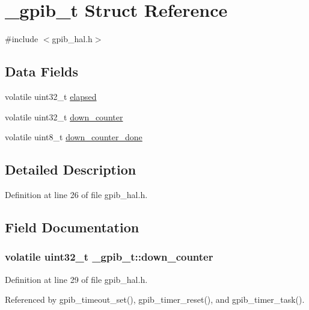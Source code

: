 \hypertarget{struct__gpib__t}{\section{\-\_\-gpib\-\_\-t Struct Reference}
\label{struct__gpib__t}
}


{\ttfamily \#include $<$gpib\-\_\-hal.\-h$>$}

\subsection*{Data Fields}
\begin{DoxyCompactItemize}
\item 
volatile uint32\-\_\-t \hyperlink{struct__gpib__t_a99a38aef880eb075f625f33d7bac31dd}{elapsed}
\item 
volatile uint32\-\_\-t \hyperlink{struct__gpib__t_a21ed3be06f76b0a5237b5e64bc2e8793}{down\-\_\-counter}
\item 
volatile uint8\-\_\-t \hyperlink{struct__gpib__t_af2622dd8668ecb24c42a2da2d8956538}{down\-\_\-counter\-\_\-done}
\end{DoxyCompactItemize}


\subsection{Detailed Description}


Definition at line 26 of file gpib\-\_\-hal.\-h.



\subsection{Field Documentation}
\hypertarget{struct__gpib__t_a21ed3be06f76b0a5237b5e64bc2e8793}{
\subsubsection[{down\-\_\-counter}]{\setlength{\rightskip}{0pt plus 5cm}volatile uint32\-\_\-t \-\_\-gpib\-\_\-t\-::down\-\_\-counter}}\label{struct__gpib__t_a21ed3be06f76b0a5237b5e64bc2e8793}


Definition at line 29 of file gpib\-\_\-hal.\-h.



Referenced by gpib\-\_\-timeout\-\_\-set(), gpib\-\_\-timer\-\_\-reset(), and gpib\-\_\-timer\-\_\-task().

